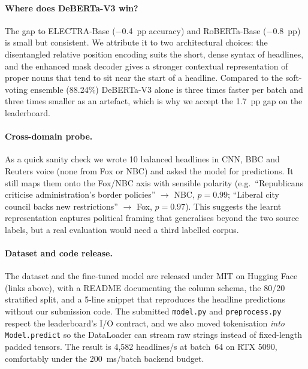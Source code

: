 \documentclass[10pt]{article}
\begin{document}
\paragraph{Where does DeBERTa-V3 win?} The gap to ELECTRA-Base ($-$0.4~pp accuracy) and RoBERTa-Base ($-$0.8~pp) is small but consistent. We attribute it to two architectural choices: the disentangled relative position encoding suits the short, dense syntax of headlines, and the enhanced mask decoder gives a stronger contextual representation of proper nouns that tend to sit near the start of a headline. Compared to the soft-voting ensemble (88.24\%) DeBERTa-V3 alone is three times faster per batch and three times smaller as an artefact, which is why we accept the 1.7~pp gap on the leaderboard.

\paragraph{Cross-domain probe.} As a quick sanity check we wrote 10 balanced headlines in CNN, BBC and Reuters voice (none from Fox or NBC) and asked the model for predictions. It still maps them onto the Fox/NBC axis with sensible polarity (e.g.~``Republicans criticise administration's border policies'' $\to$ NBC, $p=0.99$; ``Liberal city council backs new restrictions'' $\to$ Fox, $p=0.97$). This suggests the learnt representation captures political framing that generalises beyond the two source labels, but a real evaluation would need a third labelled corpus.

\paragraph{Dataset and code release.} The dataset and the fine-tuned model are released under MIT on Hugging Face (links above), with a README documenting the column schema, the 80/20 stratified split, and a 5-line snippet that reproduces the headline predictions without our submission code. The submitted \texttt{model.py} and \texttt{preprocess.py} respect the leaderboard's I/O contract, and we also moved tokenisation \emph{into} \texttt{Model.predict} so the DataLoader can stream raw strings instead of fixed-length padded tensors. The result is 4{,}582 headlines/s at batch~64 on RTX 5090, comfortably under the 200~ms/batch backend budget.
\end{document}
